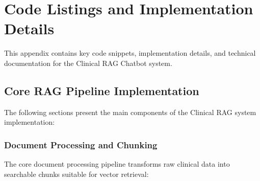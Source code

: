 \chapter{Code Listings and Implementation Details}
\label{appendix:code}

This appendix contains key code snippets, implementation details, and technical documentation for the Clinical RAG Chatbot system.

\section{Core RAG Pipeline Implementation}

The following sections present the main components of the Clinical RAG system implementation:

\subsection{Document Processing and Chunking}

The core document processing pipeline transforms raw clinical data into searchable chunks suitable for vector retrieval:

